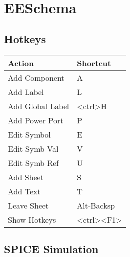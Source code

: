 \section{EESchema}


\subsection*{Hotkeys}
\begin{tabular}{l l}
Action &    Shortcut   \\ \hline
Add Component & A \\
Add Label & L \\
Add Global Label & <ctrl>H \\
Add Power Port & P \\
Edit Symbol & E \\
Edit Symb Val & V \\
Edit Symb Ref & U \\
Add Sheet & S \\
Add Text & T \\
Leave Sheet & Alt-Backsp \\
Show Hotkeys & <ctrl><F1> \\
\end{tabular}



\subsection*{SPICE Simulation}




